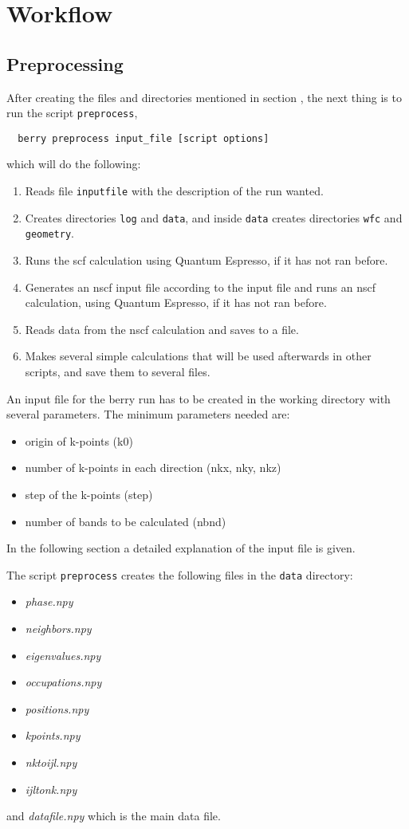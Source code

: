 \documentclass[a4paper,12pt]{report}
\begin{document}
\chapter{Workflow}\label{ch:workflow}



\section{Preprocessing}\label{sec:preprocessing}
 After creating the files and directories mentioned in section , the next thing is
 to run the script \texttt{preprocess},
 \begin{verbatim}
  berry preprocess input_file [script options]
 \end{verbatim}
 which will do the following:
 \begin{enumerate}
  \item Reads file \texttt{inputfile} with the description of the run wanted.
  \item Creates directories \verb|log| and \verb|data|, and inside \verb|data|
  creates directories \verb|wfc| and \verb|geometry|.
  \item Runs the scf calculation using {\sc Quantum Espresso}, if it has not ran before.
  \item Generates an nscf input file according to the input file and runs an nscf calculation,
  using {\sc Quantum Espresso}, if it has not ran before.
  \item Reads data from the nscf calculation and saves to a file.
  \item Makes several simple calculations that will be used afterwards in other scripts,
  and save them to several files.
 \end{enumerate}

 An input file for the berry run has to be created in the working directory with several parameters.
The minimum parameters needed are:
\begin{itemize}
 \item origin of k-points (k0)
 \item number of k-points in each direction (nkx, nky, nkz)
 \item step of the k-points (step)
 \item number of bands to be calculated (nbnd)
\end{itemize}
 In the following section a detailed explanation of the input file is given.

The script \texttt{preprocess} creates the following files in the \verb|data| directory:
\begin{itemize}
 \item \emph{phase.npy}
 \item \emph{neighbors.npy}
 \item \emph{eigenvalues.npy}
 \item \emph{occupations.npy}
 \item \emph{positions.npy}
 \item \emph{kpoints.npy}
 \item \emph{nktoijl.npy}
 \item \emph{ijltonk.npy}
\end{itemize}
and \emph{datafile.npy} which is the main data file.
\end{document}

